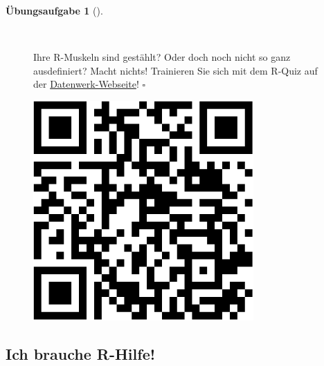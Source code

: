 \documentclass[
  a4paper,
]{scrbook}
\theoremstyle{definition}
\theoremstyle{definition}
\theoremstyle{definition}
\newtheorem{exercise}{Übungsaufgabe}[chapter]
\theoremstyle{remark}
\begin{document}
\begin{exercise}[]\protect\hypertarget{exr-rquiz}{}\label{exr-rquiz}

~

\begin{figure}

\begin{minipage}{0.80\linewidth}
Ihre R-Muskeln sind gestählt? Oder doch noch nicht so ganz ausdefiniert?
Macht nichts! Trainieren Sie sich mit dem R-Quiz auf der
\href{https://datenwerk.netlify.app/posts/r-quiz/r-quiz}{Datenwerk-Webseite}!
\(\square\)\end{minipage}%
%
\begin{minipage}{0.20\linewidth}

\begin{center}
\includegraphics[width=0.75\textwidth,height=\textheight]{020-R_files/figure-pdf/unnamed-chunk-24-1.pdf}
\end{center}

\end{minipage}%

\end{figure}%

\end{exercise}

\subsection{Ich brauche R-Hilfe!}\label{r-faq}
\end{document}
